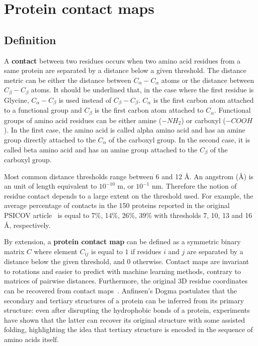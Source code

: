 \section{Protein contact maps}

    \subsection{Definition}

        A \textbf{contact} between two residues occurs when two amino acid residues from a same protein are separated by a distance below a given threshold.
        The distance metric can be either the distance between $C_{\alpha}-C_{\alpha}$ atoms or the distance between $C_{\beta}-C_{\beta}$ atoms.
        It should be underlined that, in the case where the first residue is Glycine, $C_{\alpha}-C_{\beta}$ is used instead of $C_{\beta}-C_{\beta}$.  %
        $C_{\alpha}$ is the first carbon atom attached to a functional group and $C_{\beta}$ is the first carbon atom attached to $C_{\alpha}$.
        Functional groups of amino acid residues can be either
        amine ($-NH_2$) or carboxyl ($-COOH$). In the first case, the amino acid is called alpha amino acid and has an amine group
        directly attached to the $C_{\alpha}$ of the carboxyl group. In the second case, it is called beta amino acid and has an amine group attached to
        the $C_{\beta}$ of the carboxyl group.

        Most common distance thresholds range between 6 and 12 \AA{}. An angstrom (\AA{}) is an unit of length equivalent to $10^{-10}$ m, or $10^{-1}$ nm.
        Therefore the notion of residue contact depends to a large extent on the threshold used.
        For example, the average percentage of contacts in the 150 proteins reported in the original PSICOV article~\cite{doi:10.1093/bioinformatics/btr638}
        is equal to 7\%, 14\%, 26\%, 39\% with thresholds 7, 10, 13 and 16 \AA{}, respectively.

        By extension, a \textbf{protein contact map} can be defined as a symmetric binary matrix $C$ where element $C_{ij}$ 
        is equal to $1$ if residues $i$ and $j$
        are separated by a distance below the given threshold, and $0$ otherwise. Contact maps are invariant to rotations and easier to predict
        with machine learning methods, contrary to matrices of pairwise distances. Furthermore, the original 3D residue coordinates can be recovered from
        contact maps~\cite{10.1007/978-3-540-72031-7_53}. Anfinsen's Dogma postulates that the secondary and tertiary structures
        of a protein can be inferred from its primary structure: even after disrupting the hydrophobic bonds of a protein, experiments have shown
        that the latter can recover its original structure with some assisted folding,
        highlighting the idea that tertiary structure is encoded in the sequence of amino acids itself.


